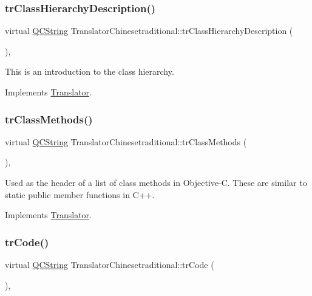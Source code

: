 \subsubsection{\texorpdfstring{trClassHierarchyDescription()}{trClassHierarchyDescription()}}
{\footnotesize\ttfamily virtual \mbox{\hyperlink{class_q_c_string}{Q\+C\+String}} Translator\+Chinesetraditional\+::tr\+Class\+Hierarchy\+Description (\begin{DoxyParamCaption}{ }\end{DoxyParamCaption})\hspace{0.3cm}{\ttfamily [inline]}, {\ttfamily [virtual]}}

This is an introduction to the class hierarchy. 

Implements \mbox{\hyperlink{class_translator}{Translator}}.

\mbox{\label{class_translator_chinesetraditional_a361fda1ff6b981ffed6d10a2b4c7fccc}} 
\subsubsection{\texorpdfstring{trClassMethods()}{trClassMethods()}}
{\footnotesize\ttfamily virtual \mbox{\hyperlink{class_q_c_string}{Q\+C\+String}} Translator\+Chinesetraditional\+::tr\+Class\+Methods (\begin{DoxyParamCaption}{ }\end{DoxyParamCaption})\hspace{0.3cm}{\ttfamily [inline]}, {\ttfamily [virtual]}}

Used as the header of a list of class methods in Objective-\/C. These are similar to static public member functions in C++. 

Implements \mbox{\hyperlink{class_translator}{Translator}}.

\mbox{\label{class_translator_chinesetraditional_a1e982f83fc7265c533b8d361b97c4a1a}} 
\subsubsection{\texorpdfstring{trCode()}{trCode()}}
{\footnotesize\ttfamily virtual \mbox{\hyperlink{class_q_c_string}{Q\+C\+String}} Translator\+Chinesetraditional\+::tr\+Code (\begin{DoxyParamCaption}{ }\end{DoxyParamCaption})\hspace{0.3cm}{\ttfamily [inline]}, {\ttfamily [virtual]}}

